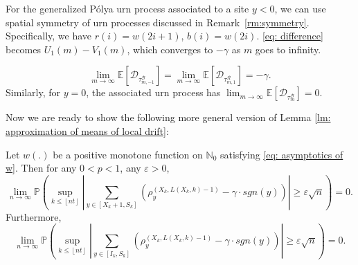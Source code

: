 \documentclass[EJP]{ejpecp} %
\newcommand{\abs}[1]{\left\vert #1 \right\vert}
\begin{document}
For the generalized P\'{o}lya urn process associated to a site $y<0$, we can use spatial symmetry of urn processes discussed in Remark~\ref{rm:symmetry}. Specifically, we have $r(i) = w(2i+1)$, $b(i) =w(2i)$. \eqref{eq: difference} becomes $U_1(m)-V_1(m)$, which converges to $-\gamma$ as $m$ goes to infinity.

\begin{equation}\label{eq: general expected drift}
	\lim_{m\to\infty}\mathbb{E}\left[ \mathscr{D}_{\tau^{\mathscr{B}}_{m,-1}} \right] = \lim_{m\to\infty}\mathbb{E}\left[ \mathscr{D}_{\tau^{\mathscr{R}}_{m,1}} \right] = -\gamma.
\end{equation}
Similarly, for $y=0$, the associated urn process has 
$\lim_{m\to\infty}\mathbb{E}\left[ \mathscr{D}_{\tau^{\mathscr{B}}_m} \right] = 0.$

%		
Now we are ready to show the following more general version of Lemma \ref{lm: approximation of means of local drift}:
\begin{lemma}
	Let $w(.)$ be a positive monotone function on $\mathbb{N}_0$ satisfying \eqref{eq: asymptotics of w}. Then for any $0<p<1$, any $\varepsilon>0$,
	\[
	\lim_{n\to\infty} \mathbb{P}\left( \sup_{k\leq \left\lfloor n t\right\rfloor}  \abs{  	\sum_{y\in \left[X_{k}+1 ,S_{k}\right]} \left( \rho^{(X_k,L(X_k,k)-1)}_y -  \gamma \cdot sgn(y) \right) } \geq  \varepsilon \sqrt{n}     \right) =0.
	\]
	Furthermore,
	\[
	\lim_{n\to\infty} \mathbb{P}\left( \sup_{k\leq \left\lfloor n t\right\rfloor}  \abs{  	\sum_{y\in \left[I_k ,S_{k}\right]} \left( \rho^{(X_k,L(X_k,k)-1)}_y -  \gamma \cdot sgn(y) \right) } \geq  \varepsilon \sqrt{n}     \right) =0.
	\]
\end{lemma}
\end{document}
